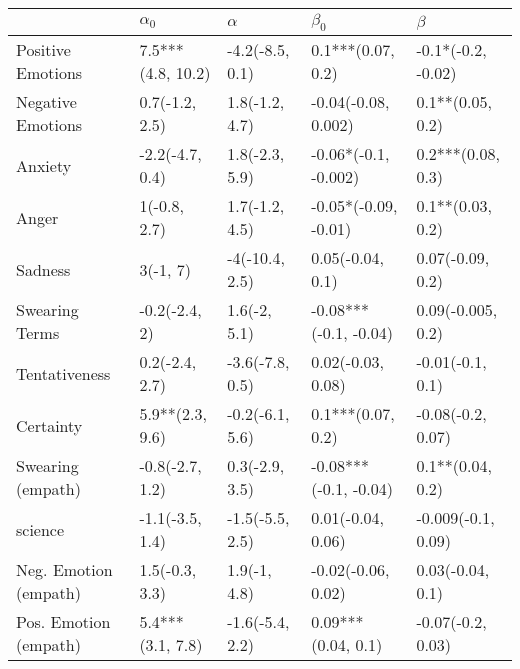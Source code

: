 \begin{tabular}{lllll}
\toprule
{} &         $\alpha_0$ &         $\alpha$ &              $\beta_0$ &             $\beta$ \\
\midrule
Positive Emotions     &  7.5***(4.8, 10.2) &  -4.2(-8.5, 0.1) &      0.1***(0.07, 0.2) &  -0.1*(-0.2, -0.02) \\
Negative Emotions     &     0.7(-1.2, 2.5) &   1.8(-1.2, 4.7) &    -0.04(-0.08, 0.002) &    0.1**(0.05, 0.2) \\
Anxiety               &    -2.2(-4.7, 0.4) &   1.8(-2.3, 5.9) &   -0.06*(-0.1, -0.002) &   0.2***(0.08, 0.3) \\
Anger                 &       1(-0.8, 2.7) &   1.7(-1.2, 4.5) &   -0.05*(-0.09, -0.01) &    0.1**(0.03, 0.2) \\
Sadness               &           3(-1, 7) &   -4(-10.4, 2.5) &       0.05(-0.04, 0.1) &    0.07(-0.09, 0.2) \\
Swearing Terms        &      -0.2(-2.4, 2) &     1.6(-2, 5.1) &  -0.08***(-0.1, -0.04) &   0.09(-0.005, 0.2) \\
Tentativeness         &     0.2(-2.4, 2.7) &  -3.6(-7.8, 0.5) &      0.02(-0.03, 0.08) &    -0.01(-0.1, 0.1) \\
Certainty             &    5.9**(2.3, 9.6) &  -0.2(-6.1, 5.6) &      0.1***(0.07, 0.2) &   -0.08(-0.2, 0.07) \\
Swearing (empath)     &    -0.8(-2.7, 1.2) &   0.3(-2.9, 3.5) &  -0.08***(-0.1, -0.04) &    0.1**(0.04, 0.2) \\
science               &    -1.1(-3.5, 1.4) &  -1.5(-5.5, 2.5) &      0.01(-0.04, 0.06) &  -0.009(-0.1, 0.09) \\
Neg. Emotion (empath) &     1.5(-0.3, 3.3) &     1.9(-1, 4.8) &     -0.02(-0.06, 0.02) &    0.03(-0.04, 0.1) \\
Pos. Emotion (empath) &   5.4***(3.1, 7.8) &  -1.6(-5.4, 2.2) &     0.09***(0.04, 0.1) &   -0.07(-0.2, 0.03) \\
\bottomrule
\end{tabular}
